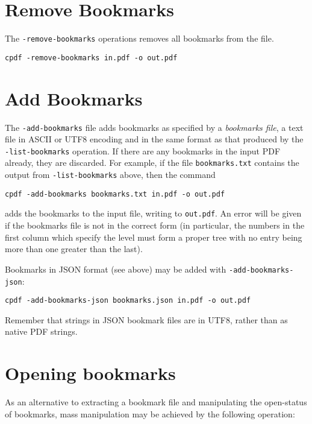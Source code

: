 \documentclass{book}
\begin{document}
  \section{Remove Bookmarks}
  \label{removebookmarks}
  The \texttt{-remove-bookmarks} operations removes all bookmarks from the file.
  \begin{framed}
    \small\verb!cpdf -remove-bookmarks in.pdf -o out.pdf!
  \end{framed}

  \section{Add Bookmarks}
  
  The \texttt{-add-bookmarks} file adds bookmarks as specified by a
\textit{bookmarks file}, a text file in ASCII or UTF8 encoding and in the same format as that produced by the
\texttt{-list-bookmarks} operation. If there are any bookmarks in the input PDF
already, they are discarded. For example, if the file \texttt{bookmarks.txt}
contains the output from \texttt{-list-bookmarks} above, then the command
  \begin{framed}
   \small\verb!cpdf -add-bookmarks bookmarks.txt in.pdf -o out.pdf!
  \end{framed}
\noindent adds the bookmarks to the input file, writing to \texttt{out.pdf}. An error
will be given if the bookmarks file is not in the correct form (in particular,
the numbers in the first column which specify the level must form a proper
tree with no entry being more than one greater than the last).

Bookmarks in JSON format (see above) may be added with \texttt{-add-bookmarks-json}:

  \begin{framed}
   \small\verb!cpdf -add-bookmarks-json bookmarks.json in.pdf -o out.pdf!
  \end{framed}

Remember that strings in JSON bookmark files are in UTF8, rather than as native PDF strings.

\section{Opening bookmarks}
As an alternative to extracting a bookmark file and manipulating the open-status of bookmarks, mass manipulation may be achieved by the following operation:
\end{document}
